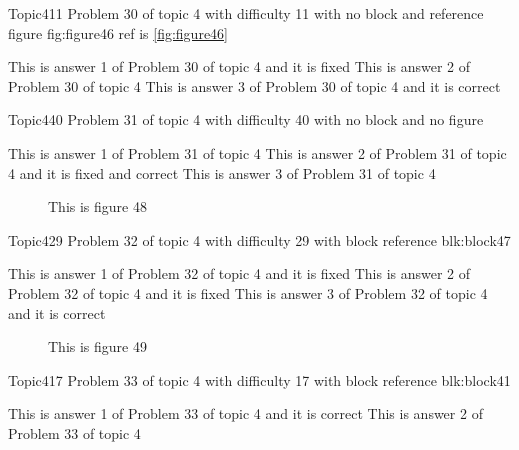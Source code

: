 \documentclass[master]{exam}
\begin{document}
\begin{problem}{Topic4}{11}
	Problem 30 of topic 4 with difficulty 11 with no block and reference figure fig:figure46 ref is \ref{fig:figure46}
	\begin{answers}
		\answer[fixed] This is answer 1 of Problem 30 of topic 4 and it is fixed
		\answer This is answer 2 of Problem 30 of topic 4 
		\answer[correct] This is answer 3 of Problem 30 of topic 4 and it is correct
	\end{answers}
\end{problem}

\begin{problem}{Topic4}{40}
	Problem 31 of topic 4 with difficulty 40 with no block and no figure
	\begin{answers}
		\answer This is answer 1 of Problem 31 of topic 4 
		 This is answer 2 of Problem 31 of topic 4 and it is fixed and correct
		\answer This is answer 3 of Problem 31 of topic 4 
	\end{answers}
\end{problem}



\begin{figure}
	\begin{center}
		This is figure 48 
		\label{fig:figure48}
	\end{center}
\end{figure}

\begin{problem}[requires=blk:block47]{Topic4}{29}
	Problem 32 of topic 4 with difficulty 29 with block reference blk:block47
	\begin{answers}
		\answer[fixed] This is answer 1 of Problem 32 of topic 4 and it is fixed
		\answer[fixed] This is answer 2 of Problem 32 of topic 4 and it is fixed
		\answer[correct] This is answer 3 of Problem 32 of topic 4 and it is correct
	\end{answers}
\end{problem}



\begin{figure}
	\begin{center}
		This is figure 49 
		\label{fig:figure49}
	\end{center}
\end{figure}

\begin{problem}[requires=blk:block41]{Topic4}{17}
	Problem 33 of topic 4 with difficulty 17 with block reference blk:block41
	\begin{answers}
		\answer[correct] This is answer 1 of Problem 33 of topic 4 and it is correct
		\answer This is answer 2 of Problem 33 of topic 4 
	\end{answers}
\end{problem}
\end{document}
